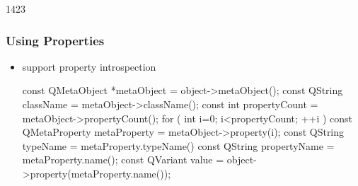 \begin{slide}[fragile]{1423}
\frametitle{Using Properties}
\begin{itemize}
\item {} support property introspection\smallskip
  \begin{cpp}
  const QMetaObject *metaObject = object->metaObject();
  const QString className = metaObject->className();
  const int propertyCount = metaObject->propertyCount();
  for ( int i=0; i<propertyCount; ++i ) {
    const QMetaProperty metaProperty = metaObject->property(i);
    const QString typeName = metaProperty.typeName()
    const QString propertyName = metaProperty.name();
    const QVariant value = object->property(metaProperty.name());
  }
  \end{cpp}
\end{itemize}
\end{slide}

